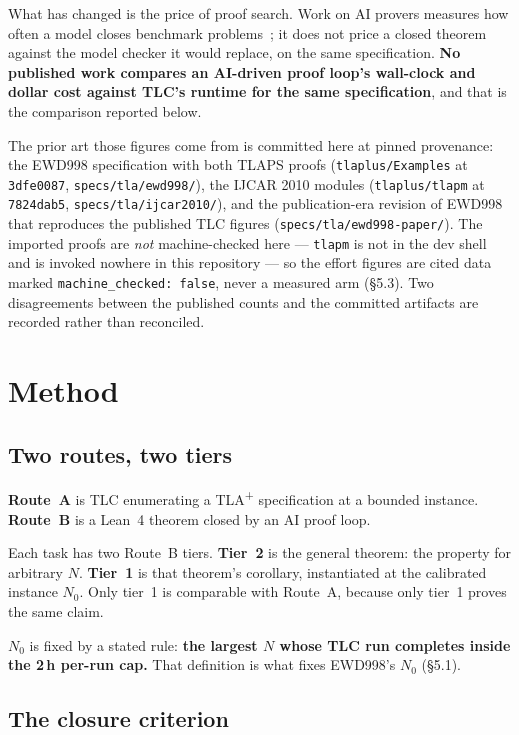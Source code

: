\documentclass[11pt,a4paper]{article}
\begin{document}
What has changed is the price of proof search. Work on AI provers measures how often a model closes
benchmark problems~\cite{deepseek-prover-v2,kimina-prover,goedel-prover}; it does not price a closed
theorem against the model checker it would replace, on the same specification. \textbf{No published work
compares an AI-driven proof loop's wall-clock and dollar cost against TLC's runtime for the same
specification}, and that is the comparison reported below.

The prior art those figures come from is committed here at pinned provenance: the EWD998 specification
with both TLAPS proofs (\texttt{tlaplus/Examples} at \texttt{3dfe0087}, \texttt{specs/tla/ewd998/}), the
IJCAR 2010 modules (\texttt{tlaplus/tlapm} at \texttt{7824dab5}, \texttt{specs/tla/ijcar2010/}), and the
publication-era revision of EWD998 that reproduces the published TLC figures
(\texttt{specs/tla/ewd998-paper/}). The imported proofs are \emph{not} machine-checked here ---
\texttt{tlapm} is not in the dev shell and is invoked nowhere in this repository --- so the effort
figures are cited data marked \texttt{machine\_checked: false}, never a measured arm (\S5.3). Two
disagreements between the published counts and the committed artifacts are recorded rather than
reconciled.

\section{Method}

\subsection{Two routes, two tiers}

\textbf{Route~A} is TLC enumerating a TLA\textsuperscript{+} specification at a bounded instance.
\textbf{Route~B} is a Lean~4 theorem closed by an AI proof loop.

Each task has two Route~B tiers. \textbf{Tier~2} is the general theorem: the property for arbitrary
$N$. \textbf{Tier~1} is that theorem's corollary, instantiated at the calibrated instance $N_0$. Only
tier~1 is comparable with Route~A, because only tier~1 proves the same claim.

$N_0$ is fixed by a stated rule: \textbf{the largest $N$ whose TLC run completes inside the 2\,h
per-run cap.} That definition is what fixes EWD998's $N_0$ (\S5.1).

\subsection{The closure criterion}
\end{document}
